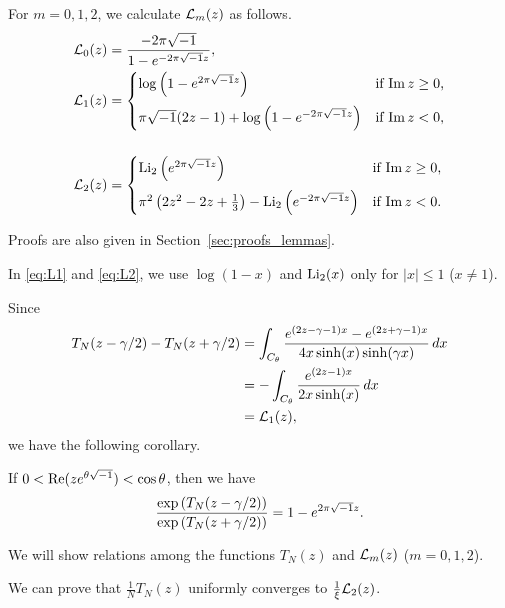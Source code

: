 \begin{lem}\label{lem:L0_1_2}
For $m=0,1,2$, we calculate $\mathcal{L}_{m}(z)$ as follows.
\begin{align}
  \mathcal{L}_0(z)
  &=
  \frac{-2\pi\sqrt{-1}}{1-e^{-2\pi\sqrt{-1} z}},
  \label{eq:L0}
  \\
  \mathcal{L}_1(z)
  &=
  \begin{cases}
    \log\left(1-e^{2\pi\sqrt{-1} z}\right)&\text{if $\operatorname{Im}{z}\ge0$,}
    \\[3mm]
    \pi\sqrt{-1}(2z-1)+\log\left(1-e^{-2\pi\sqrt{-1} z}\right)&\text{if $\operatorname{Im}{z}<0$,}
  \end{cases}
  \label{eq:L1}
  \\[5mm]
  \mathcal{L}_2(z)
  &=
  \begin{cases}
    \operatorname{Li}_2\left(e^{2\pi\sqrt{-1} z}\right)&\text{if $\operatorname{Im}{z}\ge0$,}
    \\[3mm]
    \pi^2\left(2z^2-2z+\frac{1}{3}\right)-\operatorname{Li}_2\left(e^{-2\pi\sqrt{-1} z}\right)
    &\text{if $\operatorname{Im}{z}<0$}.
  \end{cases}
  \label{eq:L2}
\end{align}
\end{lem}
Proofs are also given in Section~\ref{sec:proofs_lemmas}.
\begin{rem}
In \eqref{eq:L1} and \eqref{eq:L2}, we use $\log(1-x)$ and $\operatorname{Li}_2(x)$ only for $|x|\le1$ ($x\ne1$).
\end{rem}
Since
\begin{equation*}
\begin{split}
  T_{N}(z-\gamma/2)-T_{N}(z+\gamma/2)
  &=
  \int_{C_{\theta}}
  \frac{e^{(2z-\gamma-1)x}-e^{(2z+\gamma-1)x}}{4x\sinh(x)\sinh(\gamma x)}\,dx
  \\
  &=
  -
  \int_{C_{\theta}}
  \frac{e^{(2z-1)x}}{2x\sinh(x)}\,dx
  \\
  &=
  \mathcal{L}_1(z),
\end{split}
\end{equation*}
we have the following corollary.
\begin{cor}
If $0<\operatorname{Re}(ze^{\theta\sqrt{-1}})<\cos\theta$, then we have
\begin{equation}\label{eq:lem}
  \frac{\exp\left(T_{N}(z-\gamma/2)\right)}{\exp\left(T_{N}(z+\gamma/2)\right)}
  =
  1-e^{2\pi\sqrt{-1} z}.
\end{equation}
\end{cor}
\par
We will show relations among the functions $T_{N}(z)$ and $\mathcal{L}_{m}(z)$ ($m=0,1,2$).
\par
We can prove that $\frac{1}{N}T_{N}(z)$ uniformly converges to $\frac{1}{\xi}\mathcal{L}_{2}(z)$.
